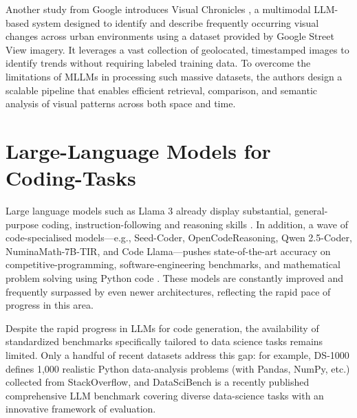 Another study from Google introduces Visual Chronicles \cite{Deng2025VisualChronicles}, a multimodal LLM-based system designed to identify and describe frequently occurring visual changes across urban environments using a dataset provided by Google Street View imagery. It leverages a vast collection of geolocated, timestamped images to identify trends without requiring labeled training data. To overcome the limitations of MLLMs in processing such massive datasets, the authors design a scalable pipeline that enables efficient retrieval, comparison, and semantic analysis of visual patterns across both space and time.



\section{Large-Language Models for Coding-Tasks}

Large language models such as Llama 3 \cite{Grattafiori2024Llama3} already display substantial, general-purpose coding, instruction-following and reasoning skills \cite{Grattafiori2024Llama3}. In addition, a wave of code-specialised models—e.g., Seed-Coder, OpenCodeReasoning, Qwen 2.5-Coder, NuminaMath-7B-TIR, and Code Llama—pushes state-of-the-art accuracy on competitive-programming, software-engineering benchmarks, and mathematical problem solving using Python code \cite{Seed2025SeedCoder, Ahmad2025OCRNVidia, Hui2024Qwen25Coder, Roziere2024CodeLlama, Moshkov2025AIMO2, Yin2024MuMathCode, Gou2024ToRA}. These models are constantly improved and frequently surpassed by even newer architectures, reflecting the rapid pace of progress in this area.

Despite the rapid progress in LLMs for code generation, the availability of standardized benchmarks specifically tailored to data science tasks remains limited. Only a handful of recent datasets address this gap: for example, DS‑1000 \cite{Lai2022DS1000} defines 1,000 realistic Python data-analysis problems (with Pandas, NumPy, etc.) collected from StackOverflow, and DataSciBench \cite{Zhang2025DataSciBench} is a recently published comprehensive LLM benchmark covering diverse data-science tasks with an innovative framework of evaluation.

